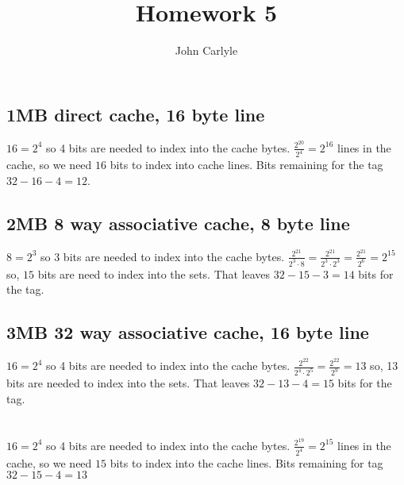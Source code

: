 \documentclass{article}
\author{John Carlyle}
\title{Homework 5}
\begin{document}
\maketitle

\section{}
\subsection{1MB direct cache, 16 byte line}
$16 = 2^4$ so 4 bits are needed to index into the cache bytes. $\frac{2^{20}}{2^4} = 2^{16}$ lines in the cache, so we need $16$ bits to index into cache lines. Bits remaining for the tag $32-16-4 = 12$.

\subsection{2MB 8 way associative cache, 8 byte line}
$8 = 2^3$ so 3 bits are needed to index into the cache bytes. $\frac{2^{21}}{2^3\cdot8} = \frac{2^21}{2^3\cdot2^3} = \frac{2^{21}}{2^6}= 2^{15}$ so, $15$ bits are need to index into the sets. That leaves $32-15-3=14$ bits for the tag.

\subsection{3MB 32 way associative cache, 16 byte line}
$16 = 2^4$ so 4 bits are needed to index into the cache bytes. $\frac{2^{22}}{2^4\cdot2^5} = \frac{2^{22}}{2^9} = 13$ so, 13 bits are needed to index into the sets. That leaves $32-13-4=15$ bits for the tag.


\section{}
\subsection{}
$16 = 2^4$ so 4 bits are needed to index into the cache bytes. $\frac{2^{19}}{2^4} = 2^{15}$ lines in the cache, so we need $15$ bits to index into the cache lines. Bits remaining for tag $32-15-4 = 13$\\
\end{document}
